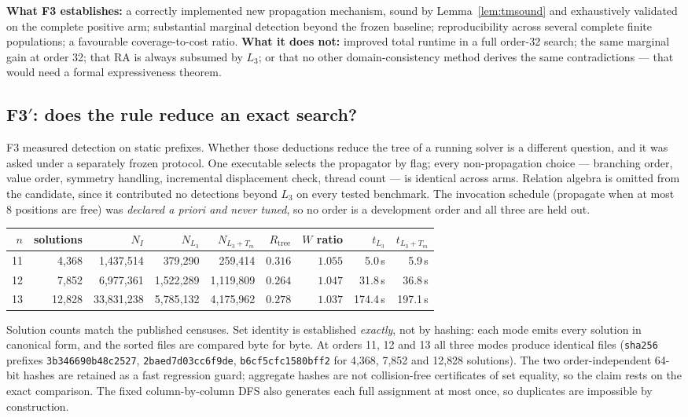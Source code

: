 \documentclass[11pt,a4paper]{article}
\theoremstyle{definition}
\begin{document}
\noindent\textbf{What F3 establishes:} a correctly implemented new propagation
mechanism, sound by Lemma~\ref{lem:tmsound} and exhaustively validated on the
complete positive arm; substantial marginal detection beyond the frozen baseline;
reproducibility across several complete finite populations; a favourable
coverage-to-cost ratio. \textbf{What it does not:} improved total runtime in a
full order-32 search; the same marginal gain at order 32; that RA is always
subsumed by $L_3$; or that no other domain-consistency method derives the same
contradictions --- that would need a formal expressiveness theorem.



\subsection{F3$'$: does the rule reduce an exact search?}
\label{sec:f3prime}

F3 measured detection on static prefixes. Whether those deductions reduce the
tree of a running solver is a different question, and it was asked under a
separately frozen protocol. One executable selects the propagator by flag; every
non-propagation choice --- branching order, value order, symmetry handling,
incremental displacement check, thread count --- is identical across arms.
Relation algebra is omitted from the candidate, since it contributed no
detections beyond $L_3$ on every tested benchmark. The invocation schedule
(propagate when at most 8 positions are free) was \emph{declared a priori and
never tuned}, so no order is a development order and all three are held out.

\begin{center}
\begin{tabular}{@{}rrrrrrrrr@{}}
\toprule
$n$ & solutions & $N_I$ & $N_{L_3}$ & $N_{L_3+T_m}$ & $R_{\text{tree}}$ & $W$ ratio & $t_{L_3}$ & $t_{L_3+T_m}$ \\
\midrule
11 & 4{,}368 & 1{,}437{,}514 & 379{,}290 & 259{,}414 & $0.316$ & $1.055$ & 5.0\,s & 5.9\,s \\
12 & 7{,}852 & 6{,}977{,}361 & 1{,}522{,}289 & 1{,}119{,}809 & $0.264$ & $1.047$ & 31.8\,s & 36.8\,s \\
13 & 12{,}828 & 33{,}831{,}238 & 5{,}785{,}132 & 4{,}175{,}962 & $0.278$ & $1.037$ & 174.4\,s & 197.1\,s \\
\bottomrule
\end{tabular}
\end{center}

\noindent Solution counts match the published censuses. Set identity is
established \emph{exactly}, not by hashing: each mode emits every solution in
canonical form, and the sorted files are compared byte for byte. At orders 11,
12 and 13 all three modes produce identical files
(\texttt{sha256} prefixes \texttt{3b346690b48c2527}, \texttt{2baed7d03cc6f9de},
\texttt{b6cf5cfc1580bff2} for 4{,}368, 7{,}852 and 12{,}828 solutions). The two
order-independent 64-bit hashes are retained as a fast regression guard;
aggregate hashes are not collision-free certificates of set equality, so the
claim rests on the exact comparison. The fixed column-by-column DFS also
generates each full assignment at most once, so duplicates are impossible by
construction.
\end{document}
